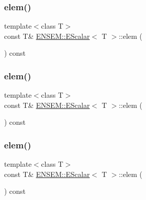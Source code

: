 \mbox{\label{classENSEM_1_1EScalar_ab3fb9173e700cc3e0bf94ffcb9d04c29}} 
\subsubsection{\texorpdfstring{elem()}{elem()}\hspace{0.1cm}{\footnotesize\ttfamily [4/6]}}
{\footnotesize\ttfamily template$<$class T$>$ \\
const T\& \mbox{\hyperlink{classENSEM_1_1EScalar}{E\+N\+S\+E\+M\+::\+E\+Scalar}}$<$ T $>$\+::elem (\begin{DoxyParamCaption}{ }\end{DoxyParamCaption}) const\hspace{0.3cm}{\ttfamily [inline]}}

\mbox{\label{classENSEM_1_1EScalar_ab3fb9173e700cc3e0bf94ffcb9d04c29}} 
\subsubsection{\texorpdfstring{elem()}{elem()}\hspace{0.1cm}{\footnotesize\ttfamily [5/6]}}
{\footnotesize\ttfamily template$<$class T$>$ \\
const T\& \mbox{\hyperlink{classENSEM_1_1EScalar}{E\+N\+S\+E\+M\+::\+E\+Scalar}}$<$ T $>$\+::elem (\begin{DoxyParamCaption}{ }\end{DoxyParamCaption}) const\hspace{0.3cm}{\ttfamily [inline]}}

\mbox{\label{classENSEM_1_1EScalar_ab3fb9173e700cc3e0bf94ffcb9d04c29}} 
\subsubsection{\texorpdfstring{elem()}{elem()}\hspace{0.1cm}{\footnotesize\ttfamily [6/6]}}
{\footnotesize\ttfamily template$<$class T$>$ \\
const T\& \mbox{\hyperlink{classENSEM_1_1EScalar}{E\+N\+S\+E\+M\+::\+E\+Scalar}}$<$ T $>$\+::elem (\begin{DoxyParamCaption}{ }\end{DoxyParamCaption}) const\hspace{0.3cm}{\ttfamily [inline]}}


